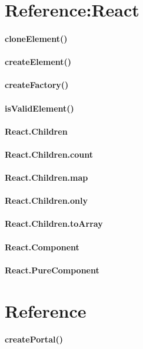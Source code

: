 \documentclass{book}
\begin{document}
\begin{CJK*}{UTF8}{gbsn}
\chapter{Reference:React}
\subsubsection{cloneElement()}
\subsubsection{createElement()}
\subsubsection{createFactory()}
\subsubsection{isValidElement()}
\subsubsection{React.Children}
\subsubsection{React.Children.count}
\subsubsection{React.Children.map}
\subsubsection{React.Children.only}
\subsubsection{React.Children.toArray}
\subsubsection{React.Component}
\subsubsection{React.PureComponent}

\chapter{Reference}
\subsubsection{createPortal()}

\end{CJK*}
\end{document}
